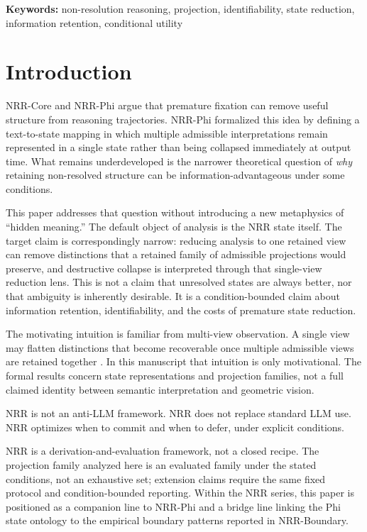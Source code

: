 \documentclass[11pt,a4paper]{article}
\begin{document}
\noindent\textbf{Keywords:} non-resolution reasoning, projection, identifiability, state reduction, information retention, conditional utility

\section{Introduction}
\label{sec:intro}

NRR-Core \cite{saito2025nrr} and NRR-Phi \cite{saito2026phi} argue that premature fixation can remove useful structure from reasoning trajectories. NRR-Phi \cite{saito2026phi} formalized this idea by defining a text-to-state mapping in which multiple admissible interpretations remain represented in a single state rather than being collapsed immediately at output time. What remains underdeveloped is the narrower theoretical question of \emph{why} retaining non-resolved structure can be information-advantageous under some conditions.

This paper addresses that question without introducing a new metaphysics of ``hidden meaning.'' The default object of analysis is the NRR state itself. The target claim is correspondingly narrow: reducing analysis to one retained view can remove distinctions that a retained family of admissible projections would preserve, and destructive collapse is interpreted through that single-view reduction lens. This is not a claim that unresolved states are always better, nor that ambiguity is inherently desirable. It is a condition-bounded claim about information retention, identifiability, and the costs of premature state reduction.

The motivating intuition is familiar from multi-view observation. A single view may flatten distinctions that become recoverable once multiple admissible views are retained together \cite{hartley2004multiple}. In this manuscript that intuition is only motivational. The formal results concern state representations and projection families, not a full claimed identity between semantic interpretation and geometric vision.

NRR is not an anti-LLM framework.
NRR does not replace standard LLM use.
NRR optimizes when to commit and when to defer, under explicit conditions.

NRR is a derivation-and-evaluation framework, not a closed recipe.
The projection family analyzed here is an evaluated family under the stated conditions, not an exhaustive set; extension claims require the same fixed protocol and condition-bounded reporting.
Within the NRR series, this paper is positioned as a companion line to NRR-Phi and a bridge line linking the Phi state ontology to the empirical boundary patterns reported in NRR-Boundary.
\end{document}
